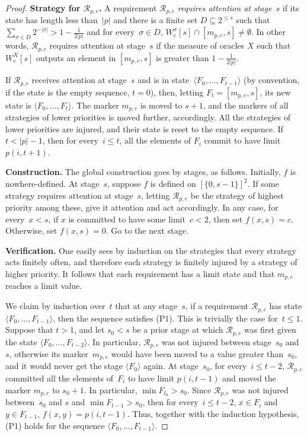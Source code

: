 \documentclass{article}
\newcommand{\R}{\mathcal{R}}
\numberwithin{theorem}{section}
\theoremstyle{definition}
\begin{document}
\begin{proof}
\smallskip

\textbf{Strategy for $\R_{p,e}$.}
A requirement $\R_{p, e}$ \emph{requires attention at stage~$s$} if its state has length less than~$|p|$ and there is a finite set $D \subseteq 2^{\leq s}$ such that $\sum_{\sigma \in D} 2^{-|\sigma|} > 1-\frac{1}{2|p|}$ and for every~$\sigma \in D$, $W_e^\sigma[s] \cap [m_{p,e}, s] \neq \emptyset$. In other words, $\R_{p,e}$ requires attention at stage~$s$ if the measure of oracles $X$ such that $W_e^X[s]$ outputs an element in $[m_{p,e}, s]$ is greater than $1-\frac{1}{2|p|}$.

If $\R_{p,e}$ receives attention at stage~$s$ and is in state~$\langle F_0, \dots, F_{t-1} \rangle$ (by convention, if the state is the empty sequence, $t = 0$), then, letting $F_t = [m_{p,e}, s]$, its new state is $\langle F_0, \dots, F_t \rangle$. The marker $m_{p,e}$ is moved to $s+1$, and the markers of all strategies of lower priorities is moved further, accordingly. All the strategies of lower priorities are injured, and their state is reset to the empty sequence. If $t < |p|-1$, then for every~$i \leq t$, all the elements of $F_i$ commit to have limit $p(i, t+1)$.
\smallskip

\textbf{Construction.}
The global construction goes by stages, as follows. Initially, $f$ is nowhere-defined.
At stage~$s$, suppose $f$ is defined on $[\{0, s-1\}]^2$. If some strategy requires attention at stage~$s$, letting $\R_{p, e}$ be the strategy of highest priority among these, give it attention and act accordingly. 
In any case, for every~$x < s$, if $x$ is committed to have some limit~$c < 2$, then set $f(x, s) = c$.
Otherwise, set $f(x, s) = 0$. Go to the next stage.
\smallskip

\textbf{Verification.}
One easily sees by induction on the strategies that every strategy acts finitely often, and therefore each strategy is finitely injured by a strategy of higher priority. It follows that each requirement has a limit state and that $m_{p,e}$ reaches a limit value.

We claim by induction over~$t$ that at any stage~$s$, if a requirement $\R_{p,e}$ has state $\langle F_0, \dots, F_{t-1}\rangle$, then the sequence satisfies (P1). This is trivially the case for~$t \leq 1$. Suppose that $t > 1$, and let $s_0 < s$ be a prior stage at which $\R_{p,e}$ was first given the state $\langle F_0, \dots, F_{t-2}\rangle$. In particular, $\R_{p,e}$ was not injured between stage~$s_0$ and $s$, otherwise its marker~$m_{p,e}$ would have been moved to a value greater than~$s_0$, and it would never get the stage $\langle F_0 \rangle$ again. At stage~$s_0$, for every~$i \leq t-2$, $\R_{p,e}$ committed all the elements of~$F_i$ to have limit $p(i, t-1)$ and moved the marker $m_{p,e}$ to $s_0+1$. In particular, $\min F_{t_0} > s_0$. Since $\R_{p,e}$ was not injured between~$s_0$ and $s$ and $\min F_{t-1} > s_0$, then for every~$i \leq t-2$, $x \in F_i$ and $y \in F_{t-1}$, $f(x, y) = p(i,t-1)$. Thus, together with the induction hypothesis, (P1) holds for the sequence $\langle F_0, \dots, F_{t-1}\rangle$.


\end{proof}
\end{document}
